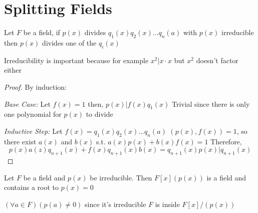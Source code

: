 
\section{Splitting Fields}

\begin{lemma}
	\label{lem:euclid's lemma}
	Let \(F\) be a field, if \(p(x)\) divides \(q_1(x)q_2(x)\ldots q_n(a) \) with \(p(x)\) irreducible then \(p(x)\) divides one of the \(q_i(x)\)
	\begin{note}
		Irreducibility is important because for example \(x^2|x \cdot x\) but \(x^2\) doesn't factor either
	\end{note}
\end{lemma}
\begin{proof}
	By induction:
	
	\emph{Base Case:} 
	Let \(f(x) = 1\) then, \(p(x) | f(x)q_1(x)\) 
	Trivial since there is only one polynomial for \(p(x)\) to divide

	\emph{Inductive Step:} 
	Let \(f(x) = q_1(x)q_2(x)\ldots q_n(a)\)
	\((p(x), f(x)) = 1\), so there exist \(a(x)\) and \(b(x)\) s.t. \(a(x)p(x) + b(x)f(x) = 1\)
	Therefore, 
	\[
		p(x)a(z)q_{n+1}(x) + f(x)q_{n+1}(x)b(x) = q_{n+1}(x)
		p(x) | q_{n+1}(x)
	\]
\end{proof}

\begin{proposition}
	Let \(F\)  be a field and \(p(x)\) be irreducible. Then \(F[x](p(x))\) is a field and contains a root to \(p(x) = 0\)
	\begin{note}
		\((\forall a \in F)(p(a) \neq 0)\) since it's irreducible
		\(F\) is inside \(F[x]/(p(x))\) 
	\end{note} 
\end{proposition} 
